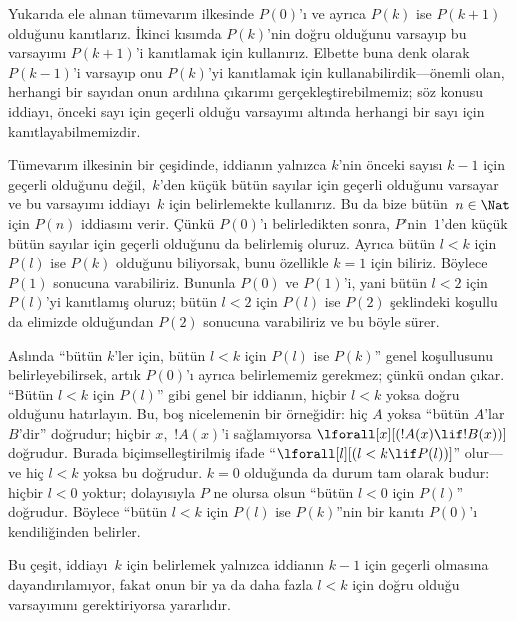 



Yukarıda ele alınan tümevarım ilkesinde $P(0)$'ı ve ayrıca $P(k)$ ise
$P(k+1)$ olduğunu kanıtlarız. İkinci kısımda $P(k)$'nin doğru olduğunu
varsayıp bu varsayımı $P(k+1)$'i kanıtlamak için kullanırız. Elbette
buna denk olarak $P(k-1)$'i varsayıp onu $P(k)$'yi kanıtlamak için
kullanabilirdik---önemli olan, herhangi bir sayıdan onun ardılına
çıkarımı gerçekleştirebilmemiz; söz konusu iddiayı, önceki sayı için
geçerli olduğu varsayımı altında herhangi bir sayı için
kanıtlayabilmemizdir.

Tümevarım ilkesinin bir çeşidinde, iddianın yalnızca $k$'nin önceki
sayısı $k-1$ için geçerli olduğunu değil,~$k$'den küçük bütün sayılar
için geçerli olduğunu varsayar ve bu varsayımı iddiayı~$k$ için
belirlemekte kullanırız. Bu da bize bütün~$n \in \Nat$ için $P(n)$
iddiasını verir. Çünkü $P(0)$'ı belirledikten sonra, $P$'nin~$1$'den
küçük bütün sayılar için geçerli olduğunu da belirlemiş oluruz. Ayrıca
bütün $l<k$ için $P(l)$ ise $P(k)$ olduğunu biliyorsak, bunu özellikle
$k=1$ için biliriz. Böylece $P(1)$ sonucuna varabiliriz. Bununla $P(0)$
ve $P(1)$'i, yani bütün $l<2$ için $P(l)$'yi kanıtlamış oluruz; bütün
$l<2$ için $P(l)$ ise $P(2)$ şeklindeki koşullu da elimizde olduğundan
$P(2)$ sonucuna varabiliriz ve bu böyle sürer.

Aslında ``bütün $k$'ler için, bütün $l<k$ için $P(l)$ ise $P(k)$''
genel koşullusunu belirleyebilirsek, artık $P(0)$'ı ayrıca belirlememiz
gerekmez; çünkü ondan çıkar. ``Bütün $l<k$ için $P(l)$'' gibi genel bir
iddianın, hiçbir $l<k$ yoksa doğru olduğunu hatırlayın. Bu, boş
nicelemenin bir örneğidir: hiç $A$ yoksa ``bütün $A$'lar $B$'dir''
doğrudur; hiçbir $x$,~$!A(x)$'i sağlamıyorsa
$\lforall[x][(!A(x) \lif !B(x))]$ doğrudur. Burada biçimselleştirilmiş
ifade ``$\lforall[l][(l < k \lif P(l))]$'' olur---ve hiç $l < k$ yoksa
bu doğrudur. $k=0$ olduğunda da durum tam olarak budur: hiçbir $l<0$
yoktur; dolayısıyla $P$ ne olursa olsun ``bütün $l<0$ için $P(l)$''
doğrudur. Böylece ``bütün $l<k$ için $P(l)$ ise $P(k)$''nin bir kanıtı
$P(0)$'ı kendiliğinden belirler.

Bu çeşit, iddiayı~$k$ için belirlemek yalnızca iddianın $k-1$ için
geçerli olmasına dayandırılamıyor, fakat onun bir ya da daha fazla
$l<k$ için doğru olduğu varsayımını gerektiriyorsa yararlıdır.

